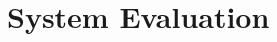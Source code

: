\documentclass[runningheads,a4paper]{llncs}
\begin{document}





\section{System Evaluation}
\label{sec:evaluation}
\end{document}

